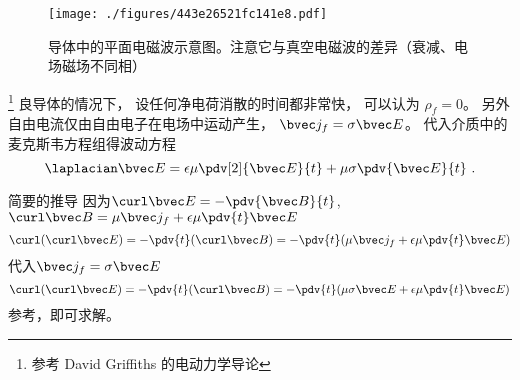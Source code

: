 
\begin{figure}[ht]
\centering
\texttt{[image: ./figures/443e26521fc141e8.pdf]}
\caption{导体中的平面电磁波示意图。注意它与真空电磁波的差异（衰减、电场磁场不同相）} \label{fig_MetalW_1}
\end{figure}

\footnote{参考 David Griffiths 的电动力学导论} 良导体的情况下， 设任何净电荷消散的时间都非常快， 可以认为 $\rho_f = 0$。 另外自由电流仅由自由电子在电场中运动产生， $\bvec j_f = \sigma \bvec E$。 代入介质中的麦克斯韦方程组得波动方程
\begin{equation}
\laplacian \bvec E = \epsilon \mu \pdv[2]{\bvec E}{t} + \mu\sigma \pdv{\bvec E}{t}~.
\end{equation}

\begin{example}{简要的推导}
因为$\curl\bvec E = -\pdv{\bvec B}{t}$, $\curl\bvec B = \mu \bvec j_f + \epsilon\mu \pdv{t} \bvec E$
\begin{equation}
\curl(\curl\bvec E) = -\pdv{t} (\curl\bvec B) =-\pdv{t}(\mu \bvec j_f + \epsilon\mu \pdv{t} \bvec E)
\end{equation}
代入$\bvec j_f = \sigma \bvec E$
\begin{equation}
\curl(\curl\bvec E) = -\pdv{t} (\curl\bvec B) =-\pdv{t}(\mu \sigma \bvec E + \epsilon\mu \pdv{t} \bvec E)
\end{equation}
参考，即可求解。
\end{example}


